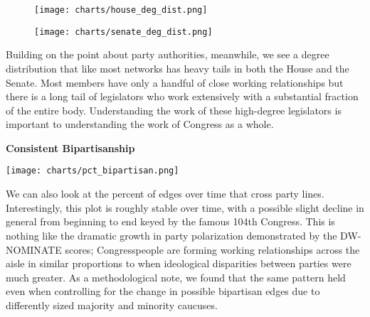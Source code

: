 \begin{figure}[htbp]
  \centering
  \begin{minipage}[h]{0.4\textwidth}
    \texttt{[image: charts/house\_deg\_dist.png]}
  \end{minipage}
  \hfill
  \begin{minipage}[h]{0.4\textwidth}
    \texttt{[image: charts/senate\_deg\_dist.png]}
  \end{minipage}
\end{figure}

Building on the point about party authorities, meanwhile, we see a degree
distribution that like most networks has heavy tails in both the House and the
Senate. Most members have only a handful of close working relationships but
there is a long tail of legislators who work extensively with a substantial
fraction of the entire body. Understanding the work of these high-degree
legislators is important to understanding the work of Congress as a whole.

\vspace{3mm}

\noindent
\textbf{Consistent Bipartisanship}

\vspace{3mm}

\texttt{[image: charts/pct\_bipartisan.png]}

We can also look at the percent of edges over time that cross party lines.
Interestingly, this plot is roughly stable over time, with a possible slight
decline in general from beginning to end keyed by the famous 104th Congress.
This is nothing like the dramatic growth in party polarization demonstrated by
the DW-NOMINATE scores; Congresspeople are forming working relationships across
the aisle in similar proportions to when ideological disparities between parties
were much greater. As a methodological note, we found that the same pattern held
even when controlling for the change in possible bipartisan edges due to
differently sized majority and minority caucuses.
